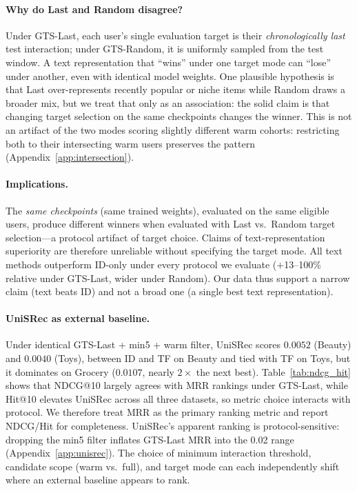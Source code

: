 \documentclass[sigconf,natbib=true,anonymous]{acmart}
\begin{document}
\paragraph{Why do Last and Random disagree?}
Under GTS-Last, each user's single evaluation target is their \emph{chronologically last} test interaction; under GTS-Random, it is uniformly sampled from the test window.
A text representation that ``wins'' under one target mode can ``lose'' under another, even with identical model weights.
One plausible hypothesis is that Last over-represents recently popular or niche items while Random draws a broader mix, but we treat that only as an association: the solid claim is that changing target selection on the same checkpoints changes the winner.
This is not an artifact of the two modes scoring slightly different warm cohorts: restricting both to their intersecting warm users preserves the pattern (Appendix~\ref{app:intersection}).

\paragraph{Implications.}
The \emph{same checkpoints} (same trained weights), evaluated on the same eligible users, produce different winners when evaluated with Last vs.\ Random target selection---a protocol artifact of target choice.
Claims of text-representation superiority are therefore unreliable without specifying the target mode.
All text methods outperform ID-only under every protocol we evaluate ($+$13--100\% relative under GTS-Last, wider under Random).
Our data thus support a narrow claim (text beats ID) and not a broad one (a single best text representation).

\paragraph{UniSRec as external baseline.}
Under identical GTS-Last + min5 + warm filter, UniSRec scores $0.0052$ (Beauty) and $0.0040$ (Toys), between ID and TF on Beauty and tied with TF on Toys, but it dominates on Grocery ($0.0107$, nearly $2\times$ the next best).
Table~\ref{tab:ndcg_hit} shows that NDCG@10 largely agrees with MRR rankings under GTS-Last, while Hit@10 elevates UniSRec across all three datasets, so metric choice interacts with protocol.
We therefore treat MRR as the primary ranking metric and report NDCG/Hit for completeness.
UniSRec's apparent ranking is protocol-sensitive: dropping the min5 filter inflates GTS-Last MRR into the 0.02 range (Appendix~\ref{app:unisrec}).
The choice of minimum interaction threshold, candidate scope (warm vs.\ full), and target mode can each independently shift where an external baseline appears to rank.
\end{document}
